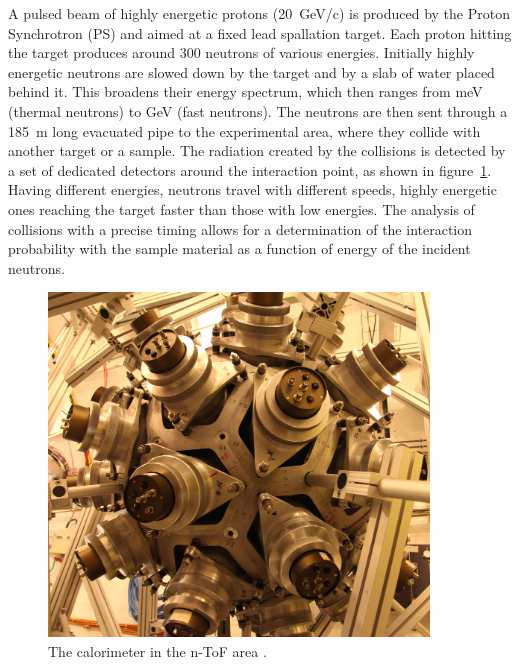 \begin{description}
A pulsed beam of highly energetic protons (20~GeV/c) is produced by the Proton Synchrotron (PS) and aimed at a fixed lead spallation target. Each proton hitting the target produces around 300 neutrons of various energies. Initially highly energetic neutrons are slowed down by the target and by a slab of water placed behind it. This broadens their energy spectrum, which then ranges from meV (thermal neutrons) to GeV (fast neutrons). The neutrons are then sent through a 185~m long evacuated pipe to the experimental area, where they collide with another target or a sample. The radiation created by the collisions is detected by a set of dedicated detectors around the interaction point, as shown in figure~\ref{fig:ntof}. Having different energies, neutrons travel with different speeds, highly energetic ones reaching the target faster than those with low energies. The analysis of collisions with a precise timing allows for a determination of the interaction probability with the sample material as a function of energy of the incident neutrons.
\begin{figure}[!t]
\centering
\includegraphics[width=0.9\textwidth]{01_introduction/pics/ntof}
\caption{The calorimeter in the n-ToF area \cite{Maximilien:1304589}.}
\label{fig:ntof}
\end{figure}
\end{description}





